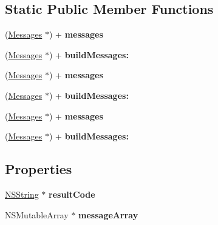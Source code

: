 \subsection*{Static Public Member Functions}
\begin{DoxyCompactItemize}
\item 
\hypertarget{interface_messages_aace157f30c3a0a62faba002aebe56d7f}{
(\hyperlink{interface_messages}{Messages} $\ast$) + {\bfseries messages}}
\label{interface_messages_aace157f30c3a0a62faba002aebe56d7f}

\item 
\hypertarget{interface_messages_a455be5c34968a96789f45de2da788be9}{
(\hyperlink{interface_messages}{Messages} $\ast$) + {\bfseries buildMessages:}}
\label{interface_messages_a455be5c34968a96789f45de2da788be9}

\item 
\hypertarget{interface_messages_aace157f30c3a0a62faba002aebe56d7f}{
(\hyperlink{interface_messages}{Messages} $\ast$) + {\bfseries messages}}
\label{interface_messages_aace157f30c3a0a62faba002aebe56d7f}

\item 
\hypertarget{interface_messages_a455be5c34968a96789f45de2da788be9}{
(\hyperlink{interface_messages}{Messages} $\ast$) + {\bfseries buildMessages:}}
\label{interface_messages_a455be5c34968a96789f45de2da788be9}

\item 
\hypertarget{interface_messages_aace157f30c3a0a62faba002aebe56d7f}{
(\hyperlink{interface_messages}{Messages} $\ast$) + {\bfseries messages}}
\label{interface_messages_aace157f30c3a0a62faba002aebe56d7f}

\item 
\hypertarget{interface_messages_a455be5c34968a96789f45de2da788be9}{
(\hyperlink{interface_messages}{Messages} $\ast$) + {\bfseries buildMessages:}}
\label{interface_messages_a455be5c34968a96789f45de2da788be9}

\end{DoxyCompactItemize}
\subsection*{Properties}
\begin{DoxyCompactItemize}
\item 
\hypertarget{interface_messages_ac3ef03545774057f685123a76a014abd}{
\hyperlink{class_n_s_string}{NSString} $\ast$ {\bfseries resultCode}}
\label{interface_messages_ac3ef03545774057f685123a76a014abd}

\item 
\hypertarget{interface_messages_a6744e3fdb71beee4bdfa2998a0684de2}{
NSMutableArray $\ast$ {\bfseries messageArray}}
\label{interface_messages_a6744e3fdb71beee4bdfa2998a0684de2}

\end{DoxyCompactItemize}


